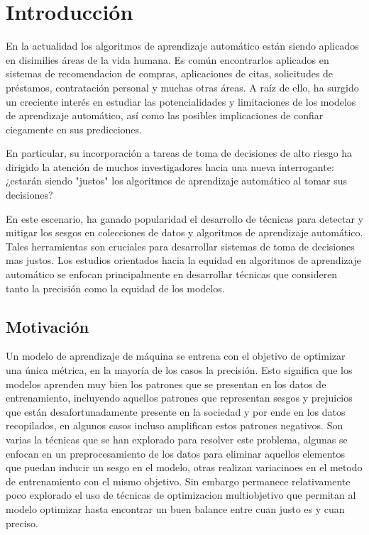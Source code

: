 \chapter*{Introducción}\label{chapter:introduction}

En la actualidad los algoritmos de aprendizaje automático están siendo aplicados en disimilies áreas de la vida humana. Es común encontrarlos aplicados en sistemas de recomendacion de compras, aplicaciones de citas, solicitudes de préstamos, contratación personal y muchas otras áreas.  A raíz de ello, ha surgido un creciente interés en estudiar las potencialidades y limitaciones de los modelos de aprendizaje automático, así como las posibles implicaciones de confiar ciegamente en sus predicciones.

En particular, su incorporación a tareas de toma de decisiones de alto riesgo ha dirigido la atención de muchos investigadores hacia una nueva interrogante: ¿estarán siendo "justos" los algoritmos de aprendizaje automático al tomar sus decisiones?

En este escenario, ha ganado popularidad el desarrollo de técnicas para detectar y mitigar los sesgos en colecciones de datos y algoritmos de aprendizaje automático. Tales herramientas son cruciales para desarrollar sistemas de toma de decisiones mas justos. Los estudios orientados hacia la equidad en algoritmos de aprendizaje automático se enfocan principalmente en desarrollar técnicas que consideren tanto la precisión como la equidad de los modelos.

\section*{Motivación}

Un modelo de aprendizaje de máquina se entrena con el objetivo de optimizar una única métrica, en la mayoría de los casos la precisión. Esto significa que los modelos aprenden muy bien los patrones que se presentan en los datos de entrenamiento, incluyendo aquellos patrones que representan sesgos y prejuicios que están desafortunadamente presente en la sociedad y por ende en los datos recopilados, en algunos casos incluso amplifican estos patrones negativos. Son varias la técnicas que se han explorado para resolver este problema, algunas se enfocan en un preprocesamiento de los datos para eliminar aquellos elementos que puedan inducir un sesgo en el modelo, otras realizan variacinoes en el metodo de entrenamiento con el mismo objetivo. Sin embargo permanece relativamente poco explorado el uso de técnicas de optimizacion multiobjetivo que permitan al modelo optimizar hasta encontrar un buen balance entre cuan justo es y cuan preciso.

